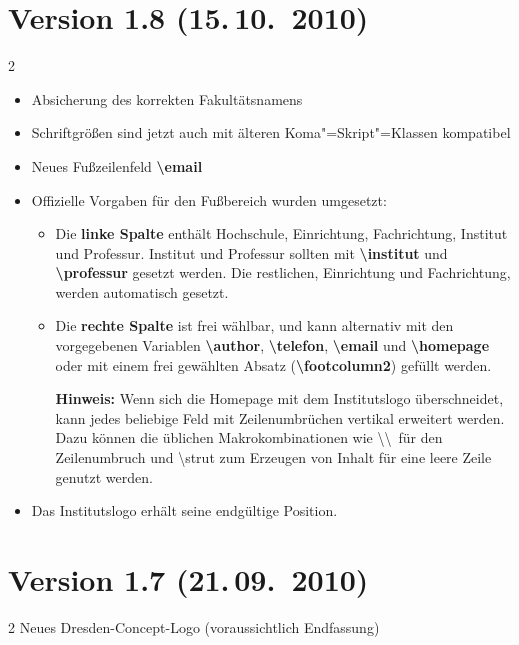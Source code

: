 \documentclass[a0paper,noDIN,MathematikA0]{tudmathposter}
\begin{document}
\section{Version 1.8 (15.\,10.~2010)}
\begin{multicols}2
\begin{itemize}
\item Absicherung des korrekten Fakultätsnamens
\item Schriftgrößen sind jetzt auch mit älteren Koma"=Skript"=Klassen kompatibel
\item Neues Fußzeilenfeld \textbf{\textbackslash email}
\item Offizielle Vorgaben für den Fußbereich wurden umgesetzt:
	\begin{itemize}
	\item 	Die \textbf{linke Spalte} enthält Hochschule, Einrichtung, Fachrichtung, Institut und 		Professur. 
		Institut und Professur sollten mit \textbf{\textbackslash institut} und 		\textbf{\textbackslash professur} gesetzt werden. Die restlichen, Einrichtung und 		Fachrichtung, werden automatisch gesetzt.
	\item 	Die \textbf{rechte Spalte} ist frei wählbar, und kann alternativ mit den vorgegebenen Variablen \textbf{\textbackslash author}, \textbf{\textbackslash telefon}, \textbf{\textbackslash email} und \textbf{\textbackslash homepage} oder mit einem frei gewählten Absatz (\textbf{\textbackslash footcolumn2}) gefüllt werden.
	
	\textbf{Hinweis:} Wenn sich die Homepage mit dem Institutslogo überschneidet, kann jedes beliebige Feld mit Zeilenumbrüchen vertikal erweitert werden. Dazu können die üblichen Makrokombinationen wie \textbackslash\textbackslash\ für den Zeilenumbruch und \textbackslash strut zum Erzeugen von Inhalt für eine leere Zeile genutzt werden.
	\end{itemize}
	\item Das Institutslogo erhält seine endgültige Position.
\end{itemize}
\end{multicols}
\section{Version 1.7 (21.\,09.~2010)}
\begin{multicols}2
Neues Dresden-Concept-Logo (voraussichtlich Endfassung)
\end{multicols}
\end{document}
